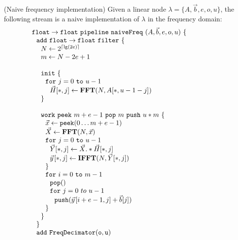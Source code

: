 \begin{transformation} (Naive frequency implementation)
Given a linear node $\lambda = \{A, {\vec b}, e, o, u\}$, the
following stream is a naive implementation of $\lambda$ in the
frequency domain: \\
\begin{equation} \nonumber
  \begin{array}{ll}
    {\tt float \rightarrow float}~{\tt pipeline~naiveFreq~}(A, {\vec b}, e, o, u){\tt ~\{} & \hspace{40pt}\\
    ~~{\tt add~float \rightarrow float~filter~\{}\\
    ~~~~N \leftarrow 2^{\lceil \lg(2e) \rceil} \\
    ~~~~m \leftarrow N-2e+1 \\
    \\
    ~~~~{\tt init}~{\tt \{} \\
    ~~~~~~{\tt for}~j=0~{\tt to}~u-1\\
    ~~~~~~~~\vec{H}[*,j] \leftarrow \mathbf{FFT}(N,A[*,u-1-j]) \\
    ~~~~{\tt \}} \\
    \\
    ~~~~{\tt work}~{\tt peek}~m+e-1~{\tt pop}~m~{\tt push}~u*m~{\tt \{} \\
    ~~~~~~\vec{x} \leftarrow {\tt peek}(0 \dots m+e-1 ) \\
    ~~~~~~\vec{X} \leftarrow \mathbf{FFT} (N, \vec{x}) \\
    ~~~~~~{\tt for}~j=0~{\tt to}~u-1\\
    ~~~~~~~~\vec{Y}[*,j] \leftarrow \vec{X} .* \vec{H}[*,j] \\
    ~~~~~~~~\vec{y}\hspace{1pt}[*,j] \leftarrow \mathbf{IFFT}(N, \vec{Y}[*,j]) \\
    ~~~~~~{\tt \}} \\
    ~~~~~~{\tt for}~i=0~{\tt to}~m-1\\
    ~~~~~~~~{\tt pop()} \\
    ~~~~~~~~{\tt for}~j=0~to~u-1\\
    ~~~~~~~~~~{\tt push}(\vec{y}\hspace{1pt}[i+e-1,j] + {\vec b}[j])\\
    ~~~~~~{\tt \}} \\
    ~~~~{\tt \}} \\
    ~~{\tt \}} \\
    ~~{\tt add~FreqDecimator(o, u)} \\

\end{array}
\end{equation}
\end{transformation}
